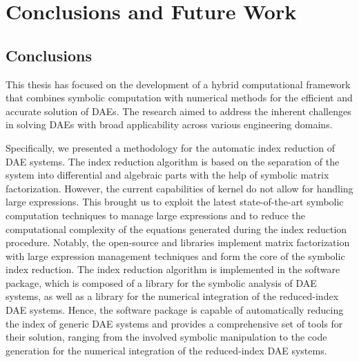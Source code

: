 
\chapter{Conclusions and Future Work}
\label{chap6:conclusions}

\section{Conclusions}

This thesis has focused on the development of a hybrid computational framework that combines symbolic computation with numerical methods for the efficient and accurate solution of \acp{DAE}. The research aimed to address the inherent challenges in solving \acp{DAE} with broad applicability across various engineering domains.

Specifically, we presented a methodology for the automatic index reduction of \ac{DAE} systems. The index reduction algorithm is based on the separation of the system into differential and algebraic parts with the help of symbolic matrix factorization. However, the current capabilities of \Maple{} kernel do not allow for handling large expressions. This brought us to exploit the latest state-of-the-art symbolic computation techniques to manage large expressions and to reduce the computational complexity of the equations generated during the index reduction procedure. Notably, the open-source \LEM{} and \LAST{} libraries implement matrix factorization with large expression management techniques and form the core of the symbolic index reduction. The index reduction algorithm is implemented in the \Indigo{} software package, which is composed of a \Maple{} library for the symbolic analysis of \ac{DAE} systems, as well as a \Matlab{} library for the numerical integration of the reduced-index \ac{DAE} systems. Hence, the \Indigo{} software package is capable of automatically reducing the index of generic \ac{DAE} systems and provides a comprehensive set of tools for their solution, ranging from the involved symbolic manipulation to the \Matlab{} code generation for the numerical integration of the reduced-index \ac{DAE} systems.

